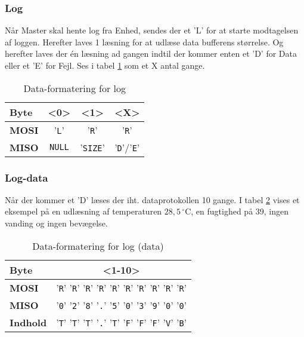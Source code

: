 \subsubsection{Log}

Når Master skal hente log fra Enhed, sendes der et 'L' for at starte modtagelsen af loggen. Herefter laves 1 læsning for at udlæse data bufferens størrelse. Og herefter laves der én læsning ad gangen indtil der kommer enten et 'D' for Data eller et 'E' for Fejl. Ses i tabel \ref{table:SWProtokol-log} som et X antal gange.

\begin{table}[H]
	\caption{Data-formatering for log}
	\centering
	\begin{tabular}{|l|c|c|c|}
		\hline 
		\textbf{Byte} & \textbf{<0>} & \textbf{<1>} & \textbf{<X>}  \\ 
		\hline 
		\textbf{MOSI} & '\verb+L+' & '\verb+R+' & '\verb+R+' \\ 
		\hline 
		\textbf{MISO} & \verb+NULL+ & '\verb+SIZE+' & '\verb+D+'/'\verb+E+' \\ 
		\hline 
	\end{tabular} 
	\label{table:SWProtokol-log}
\end{table}

\subsubsection*{Log-data}

Når der kommer et 'D' læses der iht. dataprotokollen 10 gange. I tabel \ref{table:SWProtokol-logdata} vises et eksempel på en udlæsning af temperaturen $28,5\,^{\circ}\mathrm{C}$, en fugtighed på 39, ingen vanding og ingen bevægelse.

\begin{table}[H]
	\caption{Data-formatering for log (data)}
	\centering
	\begin{tabular}{|l|c|}
		\hline 
		\textbf{Byte} & \textbf{<1-10>}  \\ 
		\hline 
		\textbf{MOSI}  & '\verb+R+' '\verb+R+' '\verb+R+' '\verb+R+' '\verb+R+' '\verb+R+' '\verb+R+' '\verb+R+' '\verb+R+' '\verb+R+'  \\ 
		\hline 
		\textbf{MISO} & '\verb+0+' '\verb+2+' '\verb+8+' '\verb+.+' '\verb+5+' '\verb+0+' '\verb+3+' '\verb+9+' '\verb+0+' '\verb+0+'  \\ 
		\hline 
		\textbf{Indhold} & '\verb+T+' '\verb+T+' '\verb+T+' '\verb+.+' '\verb+T+' '\verb+F+' '\verb+F+' '\verb+F+' '\verb+V+' '\verb+B+'  \\ 
		\hline 
	\end{tabular} 
	\label{table:SWProtokol-logdata}
\end{table}

